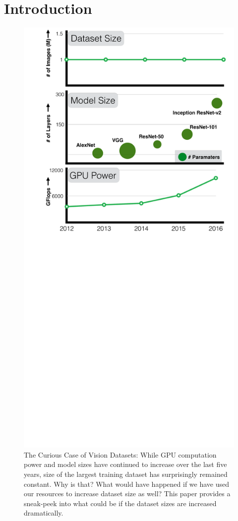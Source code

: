 \documentclass[10pt,twocolumn,letterpaper]{article}
\begin{document}
\section{Introduction}

\begin{figure}[h]
\center
\includegraphics[width=0.9\columnwidth]{Teaser}
\caption{The Curious Case of Vision Datasets: While GPU computation power and model sizes have continued to increase over the last five years, size of the largest training dataset has surprisingly remained constant. Why is that? What would have happened if we have used our resources to increase dataset size as well? This paper provides a sneak-peek into what could be if the dataset sizes are increased dramatically.}
\vspace{-0.15in}
\label{fig:teasers}
\end{figure}
\end{document}
